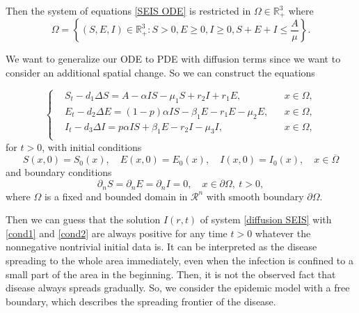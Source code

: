 \documentclass[11pt]{amsart}
\numberwithin{equation}{section}
\theoremstyle{plain}
\theoremstyle{definition}
\begin{document}
	Then the system of equations \cref{SEIS ODE} is restricted in $\Omega \in \mathbb{R}_+^3$ where
	\begin{equation} \label{omega}
		\Omega = \left\{ (S,E,I)\in \mathbb{R}_+^3 : S>0, E\geq 0, I \geq 0, S+E+I\leq \frac{A}{\mu}\right\}.
	\end{equation}
	
	We want to generalize our ODE to PDE with diffusion terms since we want to consider an additional spatial change. So we can construct the equations

	\begin{equation} \label{diffusion SEIS}
		\left \{ \begin{aligned}	
		&S_t-d_1\Delta S=A-\alpha IS-\mu_1 S+r_2 I+r_1E,&&x \in \Omega,\\
		&E_t-d_2\Delta E=(1-p)\alpha IS-\beta_1 E-r_1E-\mu_2 E,&&x \in \Omega,\\
		&I_t-d_3\Delta I=p\alpha IS+\beta_1 E-r_2I-\mu_3 I, &&x\in \Omega,\\
		\end{aligned} \right.
 	\end{equation}
 	for $t>0$, with initial conditions
 	\begin{equation} \label{cond1}
 		S(x,0)=S_0(x),  \quad E(x,0)=E_0(x), \quad I(x,0)=I_0(x), \quad x \in \overline \Omega
 	\end{equation}
 	and boundary conditions
 	\begin{equation} \label{cond2}
 		\partial_nS=\partial_nE=\partial_nI=0,\quad x\in \partial \Omega,\ t>0,
 	\end{equation}
 	where $\Omega$ is a fixed and bounded domain in $\mathcal{R}^n$ with smooth boundary $\partial \Omega$.
 	
 	Then we can guess that the solution $I(r,t)$ of system \cref{diffusion SEIS} with \cref{cond1} and \cref{cond2} are always positive for any time $t>0$ whatever the nonnegative nontrivial initial data is. It can be interpreted as the disease spreading to the whole area immediately, even when the infection is confined to a small part of the area in the beginning. Then, it is not the observed fact that disease always spreads gradually. So, we consider the epidemic model with a free boundary, which describes the spreading frontier of the disease.
 	 
\end{document}
